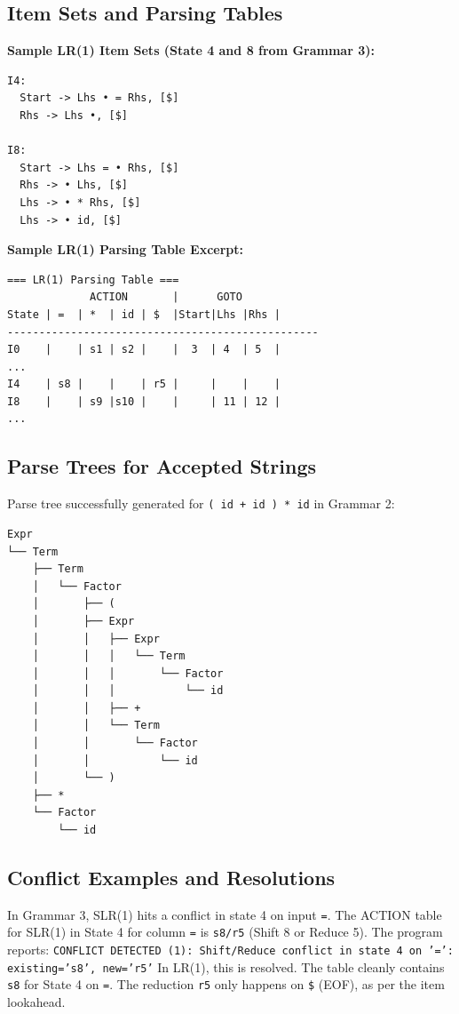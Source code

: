 \documentclass[11pt,a4paper]{article}
\begin{document}
\subsection{Item Sets and Parsing Tables}
\textbf{Sample LR(1) Item Sets (State 4 and 8 from Grammar 3):}
\begin{verbatim}
I4:
  Start -> Lhs • = Rhs, [$]
  Rhs -> Lhs •, [$]

I8:
  Start -> Lhs = • Rhs, [$]
  Rhs -> • Lhs, [$]
  Lhs -> • * Rhs, [$]
  Lhs -> • id, [$]
\end{verbatim}

\textbf{Sample LR(1) Parsing Table Excerpt:}
\begin{verbatim}
=== LR(1) Parsing Table ===
             ACTION       |      GOTO      
State | =  | *  | id | $  |Start|Lhs |Rhs |
-------------------------------------------------
I0    |    | s1 | s2 |    |  3  | 4  | 5  |
...
I4    | s8 |    |    | r5 |     |    |    |
I8    |    | s9 |s10 |    |     | 11 | 12 |
...
\end{verbatim}

\subsection{Parse Trees for Accepted Strings}
Parse tree successfully generated for \texttt{( id + id ) * id} in Grammar 2:
\begin{verbatim}
Expr
└── Term
    ├── Term
    │   └── Factor
    │       ├── (
    │       ├── Expr
    │       │   ├── Expr
    │       │   │   └── Term
    │       │   │       └── Factor
    │       │   │           └── id
    │       │   ├── +
    │       │   └── Term
    │       │       └── Factor
    │       │           └── id
    │       └── )
    ├── *
    └── Factor
        └── id
\end{verbatim}

\subsection{Conflict Examples and Resolutions}
In Grammar 3, SLR(1) hits a conflict in state 4 on input \texttt{=}. The ACTION table for SLR(1) in State 4 for column \texttt{=} is \texttt{s8/r5} (Shift 8 or Reduce 5). The program reports:
\texttt{CONFLICT DETECTED (1): Shift/Reduce conflict in state 4 on '=': existing='s8', new='r5'}
In LR(1), this is resolved. The table cleanly contains \texttt{s8} for State 4 on \texttt{=}. The reduction \texttt{r5} only happens on \texttt{\$} (EOF), as per the item lookahead.
\end{document}
